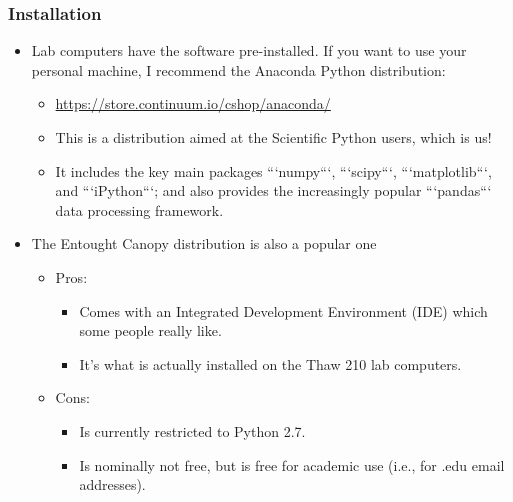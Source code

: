 \begin{frame}
\frametitle{Installation}
\begin{itemize}
  \item Lab computers have the software pre-installed.  If you want to use your personal machine, I recommend the Anaconda Python distribution:
  \begin{itemize}
    \item \url{https://store.continuum.io/cshop/anaconda/}
    \item This is a distribution aimed at the Scientific Python users, which is us!
    \item It includes the key main packages ```numpy```, ```scipy```, ```matplotlib```, and ```iPython```; and also provides the increasingly popular ```pandas``` data processing framework.
  \end{itemize}
  \item The Entought Canopy distribution is also a popular one
  \begin{itemize}
    \item Pros: 
    \begin{itemize}
      \item Comes with an Integrated Development Environment (IDE) which some people really like.  
      \item It's what is actually installed on the Thaw 210 lab computers.
    \end{itemize}
    \item Cons: 
    \begin{itemize}
      \item Is currently restricted to Python 2.7.
      \item Is nominally not free, but is free for academic use (i.e., for .edu email addresses).
    \end{itemize}
  \end{itemize}
\end{itemize}
\end{frame}


